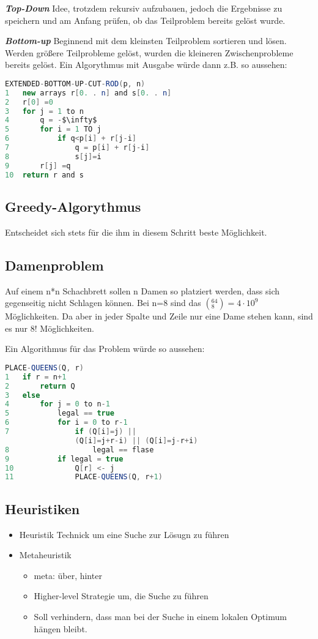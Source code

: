 \documentclass[jou,apacite]{apa6}
\begin{document}
{\bfseries\itshape Top-Down}
Idee, trotzdem rekursiv aufzubauen, jedoch die Ergebnisse zu speichern und am Anfang prüfen, ob das Teilproblem bereits gelöst wurde. 

{\bfseries\itshape Bottom-up}
Beginnend mit dem kleinsten Teilproblem sortieren und lösen. Werden größere Teilprobleme gelöst, wurden die kleineren Zwischenprobleme bereits gelöst. Ein Algorythmus mit Ausgabe würde dann z.B. so aussehen: 
\begin{lstlisting}[mathescape, language=java]
EXTENDED-BOTTOM-UP-CUT-ROD(p, n)
1   new arrays r[0. . n] and s[0. . n]
2   r[0] =0
3   for j = 1 to n
4       q = -$\infty$
5       for i = 1 TO j
6           if q<p[i] + r[j-i]
7               q = p[i] + r[j-i]
8               s[j]=i
9       r[j] =q
10  return r and s
\end{lstlisting}

\subsection{Greedy-Algorythmus}
Entscheidet sich stets für die ihm in diesem Schritt beste Möglichkeit. 

\subsection{Damenproblem}
Auf einem n*n Schachbrett sollen n Damen so platziert werden, dass sich gegenseitig nicht Schlagen können. Bei n=8 sind das $(^{64}_8) = 4\cdot10^9$ Möglichkeiten. Da aber in jeder Spalte und Zeile nur eine Dame stehen kann, sind es nur $8!$ Möglichkeiten. 

Ein Algorithmus für das Problem würde so aussehen:

\begin{lstlisting}[language=java]
PLACE-QUEENS(Q, r)
1   if r = n+1
2       return Q
3   else
4       for j = 0 to n-1
5           legal == true
6           for i = 0 to r-1
7               if (Q[i]=j) || 
                (Q[i]=j+r-i) || (Q[i]=j-r+i)
8                   legal == flase
9           if legal = true
10              Q[r] <- j
11              PLACE-QUEENS(Q, r+1)
\end{lstlisting}

\subsection{Heuristiken}
\begin{itemize}
    \item Heuristik Technick um eine Suche zur Lösugn zu führen
    \item Metaheuristik \begin{itemize}
        \item meta: über, hinter
        \item Higher-level Strategie um, die Suche zu führen
        \item Soll verhindern, dass man bei der Suche in einem lokalen Optimum hängen bleibt.
    \end{itemize}
\end{itemize}
\end{document}
